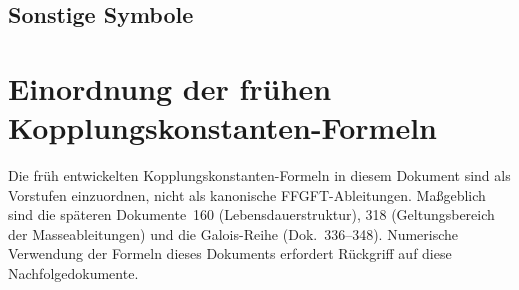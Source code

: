 \subsection{Sonstige Symbole}


\section*{Einordnung der frühen Kopplungskonstanten-Formeln}

Die früh entwickelten Kopplungskonstanten-Formeln in diesem Dokument
sind als Vorstufen einzuordnen, nicht als kanonische FFGFT-Ableitungen.
Maßgeblich sind die späteren Dokumente~160 (Lebensdauerstruktur),
318 (Geltungsbereich der Masseableitungen) und die Galois-Reihe
(Dok.~336--348). Numerische Verwendung der Formeln dieses Dokuments
erfordert Rückgriff auf diese Nachfolgedokumente.
